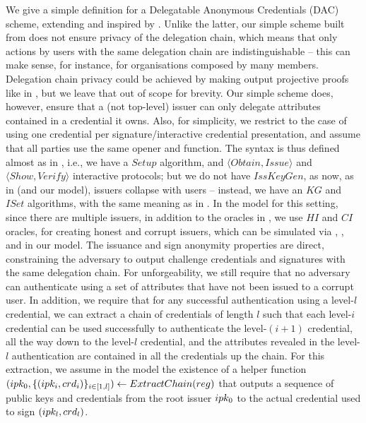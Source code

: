 We give a simple definition for a Delegatable Anonymous Credentials (DAC)
scheme, extending \cite{fhs19} and inspired by \cite{bcc+09}. Unlike the latter,
our simple scheme built from \CUASGenInt does not ensure privacy of the
delegation chain, which means that only actions by users with the same
delegation chain are indistinguishable -- this can make sense, for instance,
for organisations composed by many members. Delegation chain privacy could be
achieved by making \feval output projective proofs like in \cite{bcc+09}, but we
leave that out of scope for brevity. Our simple scheme
does, however, ensure that a (not top-level) issuer can only delegate attributes
contained in a credential it owns. Also, for simplicity, we restrict to the case
of using one credential per signature/interactive credential presentation, and
assume that all parties use the same opener and \finsp function.
%
The syntax is thus defined almost as in ,
i.e., we have a $Setup$ algorithm, and $\langle Obtain,Issue\rangle$
and $\langle Show,Verify \rangle$ interactive protocols; but we do not have
$IssKeyGen$, as now, as in \cite{bcc+09} (and our \UAS model), issuers collapse
with users -- instead, we have an $KG$ and $ISet$ algorithms, with the same
meaning as in \UAS.
%
In the model for this setting, since there are multiple issuers, in addition
to the oracles in , we use $HI$ and $CI$ oracles,
for creating honest and corrupt issuers, which can be simulated via \HUGEN,
\CUGEN, \ISET and \ICORR in our \UAS model.
%
The issuance and sign anonymity properties are direct, constraining the
adversary to output challenge credentials and signatures with the same
delegation chain. For unforgeability, we still require that no adversary can
authenticate using a set of attributes that have not been issued to a corrupt
user. In addition, we require that for any successful authentication using a
level-$l$ credential, we can extract a chain of credentials of length $l$ such
that each level-$i$ credential can be used successfully to authenticate the
level-$(i+1)$ credential, all the way down to the level-$l$ credential, and the
attributes revealed in the level-$l$ authentication are contained in all the
credentials up the chain. For this extraction, we assume in the model the
existence of a helper function $(ipk_0,\lbrace (ipk_i,crd_i)
\rbrace_{i\in[1,l]}) \gets ExtractChain(reg)$ that outputs a sequence of
public keys and credentials from the root issuer $ipk_0$ to the actual
credential used to sign $(ipk_l,crd_l)$.

